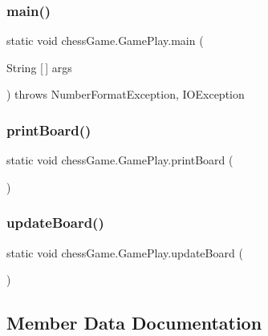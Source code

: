 \subsubsection{\texorpdfstring{main()}{main()}}
{\footnotesize\ttfamily static void chess\+Game.\+Game\+Play.\+main (\begin{DoxyParamCaption}\item[{String \mbox{[}$\,$\mbox{]}}]{args }\end{DoxyParamCaption}) throws Number\+Format\+Exception, I\+O\+Exception\hspace{0.3cm}{\ttfamily [static]}}

\hypertarget{classchess_game_1_1_game_play_a17d6ffb57cf60b47615e278c4211a2cb}{}\label{classchess_game_1_1_game_play_a17d6ffb57cf60b47615e278c4211a2cb} 
\subsubsection{\texorpdfstring{print\+Board()}{printBoard()}}
{\footnotesize\ttfamily static void chess\+Game.\+Game\+Play.\+print\+Board (\begin{DoxyParamCaption}{ }\end{DoxyParamCaption})\hspace{0.3cm}{\ttfamily [static]}}

\hypertarget{classchess_game_1_1_game_play_a5b8a3677974126f68f771a790f411163}{}\label{classchess_game_1_1_game_play_a5b8a3677974126f68f771a790f411163} 
\subsubsection{\texorpdfstring{update\+Board()}{updateBoard()}}
{\footnotesize\ttfamily static void chess\+Game.\+Game\+Play.\+update\+Board (\begin{DoxyParamCaption}{ }\end{DoxyParamCaption})\hspace{0.3cm}{\ttfamily [static]}}



\subsection{Member Data Documentation}
\hypertarget{classchess_game_1_1_game_play_a5e948d1c0d0dd5f9ec2c08077015e632}{}\label{classchess_game_1_1_game_play_a5e948d1c0d0dd5f9ec2c08077015e632} 
